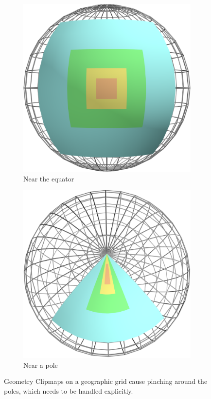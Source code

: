 \begin{figure}[htbp]
    \centering
    \begin{subfigure}[bt]{0.25\textwidth}
        \includegraphics[width=\textwidth]{figures/geometryclipmap/clipmap1.png}
        \caption{Near the equator}
    \end{subfigure}
    \quad
    \begin{subfigure}[bt]{0.25\textwidth}
        \includegraphics[width=\textwidth]{figures/geometryclipmap/clipmap2.png}
        \caption{Near a pole}
    \end{subfigure}
    \caption{Geometry Clipmaps on a geographic grid cause pinching around the poles, which needs to be handled explicitly.}
    \label{fig:mipclip}
\end{figure}

